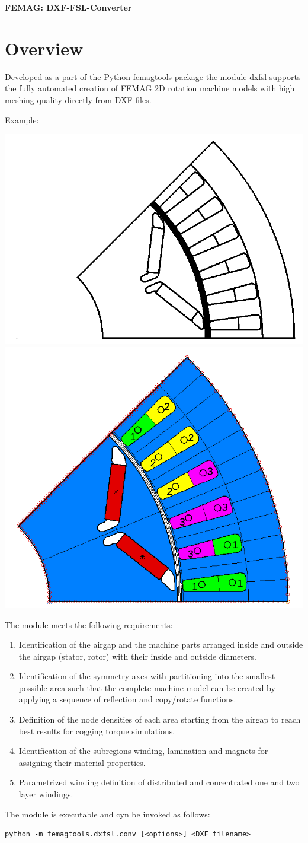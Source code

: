 \documentclass[10pt, a4paper,german]{scrartcl}
\begin{document}


\begin{center}
\LARGE\bfseries
FEMAG: DXF-FSL-Converter
\end{center}
%
\section{Overview}
Developed as a part of the Python femagtools package the module dxfsl supports the fully automated
creation of FEMAG 2D rotation machine models with high meshing quality directly from DXF files.

Example:

\includegraphics[width=0.47\linewidth]{dxf-orig} \hfill\includegraphics[width=0.4\linewidth]{femag-model}

The module meets the following requirements:
\begin{enumerate}
\item Identification of the airgap and the machine parts arranged inside and outside the airgap (stator, rotor)
 with their inside and outside diameters.
\item Identification of the symmetry axes with partitioning into the smallest possible area such that the complete
  machine model can be created by applying a sequence of reflection and copy/rotate functions.
\item Definition of the node densities of each area starting from the airgap to reach best results for
  cogging torque simulations.
\item Identification of the subregions winding, lamination and magnets for assigning their material properties.
\item Parametrized winding definition of distributed and concentrated one and two layer windings.
\end{enumerate}
The module is executable and cyn be invoked as follows:
\begin{verbatim}
python -m femagtools.dxfsl.conv [<options>] <DXF filename>
\end{verbatim}
%
\newpage
\enlargethispage{1cm}
\end{document}
